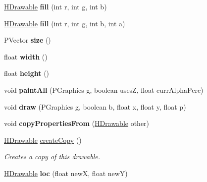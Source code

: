 \begin{DoxyCompactItemize}
\item 
\hypertarget{classhype_1_1drawable_1_1_h_stage_a55c66dfd278df300fcb6c96988dbb4da}{\hyperlink{classhype_1_1drawable_1_1_h_drawable}{H\-Drawable} {\bfseries fill} (int r, int g, int b)}\label{classhype_1_1drawable_1_1_h_stage_a55c66dfd278df300fcb6c96988dbb4da}

\item 
\hypertarget{classhype_1_1drawable_1_1_h_stage_a8ac704c5f91e673b1c7786be8cc398fd}{\hyperlink{classhype_1_1drawable_1_1_h_drawable}{H\-Drawable} {\bfseries fill} (int r, int g, int b, int a)}\label{classhype_1_1drawable_1_1_h_stage_a8ac704c5f91e673b1c7786be8cc398fd}

\item 
\hypertarget{classhype_1_1drawable_1_1_h_stage_a4d1a4833d6ab9bcfdce2f5a0d534d1ef}{P\-Vector {\bfseries size} ()}\label{classhype_1_1drawable_1_1_h_stage_a4d1a4833d6ab9bcfdce2f5a0d534d1ef}

\item 
\hypertarget{classhype_1_1drawable_1_1_h_stage_ae31a077cefbeb64d9d90cf109a3f01d9}{float {\bfseries width} ()}\label{classhype_1_1drawable_1_1_h_stage_ae31a077cefbeb64d9d90cf109a3f01d9}

\item 
\hypertarget{classhype_1_1drawable_1_1_h_stage_a1fb08f04ae51f7e7f223a1f402d59803}{float {\bfseries height} ()}\label{classhype_1_1drawable_1_1_h_stage_a1fb08f04ae51f7e7f223a1f402d59803}

\item 
\hypertarget{classhype_1_1drawable_1_1_h_stage_ae6db64ce43f05d2ccd8483d5ac6fb7b0}{void {\bfseries paint\-All} (P\-Graphics g, boolean uses\-Z, float curr\-Alpha\-Perc)}\label{classhype_1_1drawable_1_1_h_stage_ae6db64ce43f05d2ccd8483d5ac6fb7b0}

\item 
\hypertarget{classhype_1_1drawable_1_1_h_stage_af831388904234d126dc8f5c4f2c3eb25}{void {\bfseries draw} (P\-Graphics g, boolean b, float x, float y, float p)}\label{classhype_1_1drawable_1_1_h_stage_af831388904234d126dc8f5c4f2c3eb25}

\item 
\hypertarget{classhype_1_1drawable_1_1_h_stage_a69b751bec2dcc691dd73c88945bb3f84}{void {\bfseries copy\-Properties\-From} (\hyperlink{classhype_1_1drawable_1_1_h_drawable}{H\-Drawable} other)}\label{classhype_1_1drawable_1_1_h_stage_a69b751bec2dcc691dd73c88945bb3f84}

\item 
\hyperlink{classhype_1_1drawable_1_1_h_drawable}{H\-Drawable} \hyperlink{classhype_1_1drawable_1_1_h_stage_aa7e644b2063eda66b2860a8d60ba124f}{create\-Copy} ()
\begin{DoxyCompactList}\small\item\em Creates a copy of this drawable. \end{DoxyCompactList}\item 
\hypertarget{classhype_1_1drawable_1_1_h_stage_a1c85e616f556722f523819b59b6b7661}{\hyperlink{classhype_1_1drawable_1_1_h_drawable}{H\-Drawable} {\bfseries loc} (float new\-X, float new\-Y)}\label{classhype_1_1drawable_1_1_h_stage_a1c85e616f556722f523819b59b6b7661}


\end{DoxyCompactItemize}

